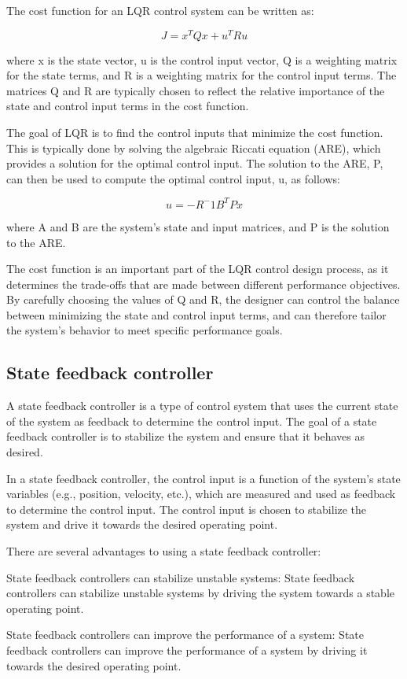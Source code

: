\documentclass[12pt]{article}
\begin{document}
The cost function for an LQR control system can be written as:

$$J = x^TQx + u^TRu$$

where x is the state vector, u is the control input vector, Q is a weighting matrix for the state terms, and R is a weighting matrix for the control input terms. The matrices Q and R are typically chosen to reflect the relative importance of the state and control input terms in the cost function.

The goal of LQR is to find the control inputs that minimize the cost function. This is typically done by solving the algebraic Riccati equation (ARE), which provides a solution for the optimal control input. The solution to the ARE, P, can then be used to compute the optimal control input, u, as follows:

$$u = -R^-1B^TPx$$

where A and B are the system's state and input matrices, and P is the solution to the ARE.

The cost function is an important part of the LQR control design process, as it determines the trade-offs that are made between different performance objectives. By carefully choosing the values of Q and R, the designer can control the balance between minimizing the state and control input terms, and can therefore tailor the system's behavior to meet specific performance goals.
\subsection{State feedback controller}
A state feedback controller is a type of control system that uses the current state of the system as feedback to determine the control input. The goal of a state feedback controller is to stabilize the system and ensure that it behaves as desired.

In a state feedback controller, the control input is a function of the system's state variables (e.g., position, velocity, etc.), which are measured and used as feedback to determine the control input. The control input is chosen to stabilize the system and drive it towards the desired operating point.

There are several advantages to using a state feedback controller:

State feedback controllers can stabilize unstable systems: State feedback controllers can stabilize unstable systems by driving the system towards a stable operating point.

State feedback controllers can improve the performance of a system: State feedback controllers can improve the performance of a system by driving it towards the desired operating point.
\end{document}
